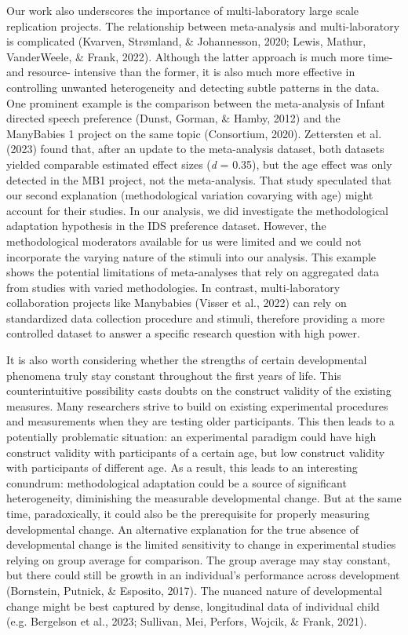 \documentclass[
  man]{apa6}
\begin{document}
Our work also underscores the importance of multi-laboratory large scale replication projects. The relationship between meta-analysis and multi-laboratory is complicated (Kvarven, Strømland, \& Johannesson, 2020; Lewis, Mathur, VanderWeele, \& Frank, 2022). Although the latter approach is much more time- and resource- intensive than the former, it is also much more effective in controlling unwanted heterogeneity and detecting subtle patterns in the data. One prominent example is the comparison between the meta-analysis of Infant directed speech preference (Dunst, Gorman, \& Hamby, 2012) and the ManyBabies 1 project on the same topic (Consortium, 2020). Zettersten et al. (2023) found that, after an update to the meta-analysis dataset, both datasets yielded comparable estimated effect sizes (\emph{d} = 0.35), but the age effect was only detected in the MB1 project, not the meta-analysis. That study speculated that our second explanation (methodological variation covarying with age) might account for their studies. In our analysis, we did investigate the methodological adaptation hypothesis in the IDS preference dataset. However, the methodological moderators available for us were limited and we could not incorporate the varying nature of the stimuli into our analysis. This example shows the potential limitations of meta-analyses that rely on aggregated data from studies with varied methodologies. In contrast, multi-laboratory collaboration projects like Manybabies (Visser et al., 2022) can rely on standardized data collection procedure and stimuli, therefore providing a more controlled dataset to answer a specific research question with high power.

It is also worth considering whether the strengths of certain developmental phenomena truly stay constant throughout the first years of life. This counterintuitive possibility casts doubts on the construct validity of the existing measures. Many researchers strive to build on existing experimental procedures and measurements when they are testing older participants. This then leads to a potentially problematic situation: an experimental paradigm could have high construct validity with participants of a certain age, but low construct validity with participants of different age. As a result, this leads to an interesting conundrum: methodological adaptation could be a source of significant heterogeneity, diminishing the measurable developmental change. But at the same time, paradoxically, it could also be the prerequisite for properly measuring developmental change. An alternative explanation for the true absence of developmental change is the limited sensitivity to change in experimental studies relying on group average for comparison. The group average may stay constant, but there could still be growth in an individual's performance across development (Bornstein, Putnick, \& Esposito, 2017). The nuanced nature of developmental change might be best captured by dense, longitudinal data of individual child (e.g. Bergelson et al., 2023; Sullivan, Mei, Perfors, Wojcik, \& Frank, 2021).
\end{document}
